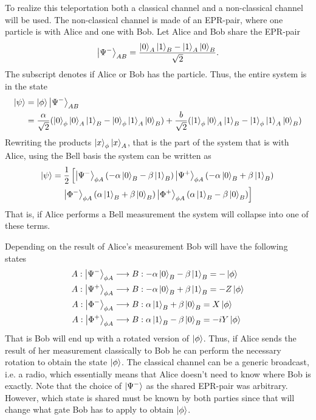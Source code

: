 To realize this teleportation both a classical channel and a non-classical channel will be used. The non-classical channel is made of an EPR-pair, where one particle is with Alice and one with Bob. Let Alice and Bob share the EPR-pair 
\begin{equation}
    \ket{\Psi^-}_{AB} = \frac{\ket{0}_A\ket{1}_B - \ket{1}_A\ket{0}_B}{\sqrt{2}}.
\end{equation}
The subscript denotes if Alice or Bob has the particle. Thus, the entire system is in the state 
\begin{align}
    \ket{\psi} &=\ket{\phi}\ket{\Psi^-}_{AB} \\ &= \frac{\alpha}{\sqrt{2}} (\ket{0}_\phi \ket{0}_A \ket{1}_B - \ket{0}_\phi \ket{1}_A \ket{0}_B) + \frac{b}{\sqrt{2}} (\ket{1}_\phi \ket{0}_A \ket{1}_B - \ket{1}_\phi \ket{1}_A \ket{0}_B)
\end{align}
Rewriting the products $\ket{x}_\phi\ket{x}_A$, that is the part of the system that is with Alice, using the Bell basis the system can be written as 
\begin{multline}
    \ket{\psi} = \frac{1}{2}\left[
        \ket{\Psi^-}_{\phi A} (-\alpha\ket{0}_B - \beta\ket{1}_B)   
        \ket{\Psi^+}_{\phi A} (-\alpha\ket{0}_B + \beta\ket{1}_B)\right.\\
        \left.\ket{\Phi^-}_{\phi A} (\alpha\ket{1}_B + \beta\ket{0}_B)
        \ket{\Phi^+}_{\phi A} (\alpha\ket{1}_B - \beta\ket{0}_B)
        \right]  
\end{multline}
That is, if Alice performs a Bell measurement the system will collapse into one of these terms. \cite{Bennett:1993}

Depending on the result of Alice's measurement Bob will have the following states
\begin{align}
    A: \ket{\Psi^-}_{\phi A} &\longrightarrow B: -\alpha\ket{0}_B - \beta \ket{1}_B = -\ket{\phi}\\
    A: \ket{\Psi^+}_{\phi A} &\longrightarrow B: -\alpha\ket{0}_B + \beta \ket{1}_B = -Z\ket{\phi}\\
    A: \ket{\Phi^-}_{\phi A} &\longrightarrow B: \alpha\ket{1}_B + \beta \ket{0}_B = X\ket{\phi}\\
    A: \ket{\Phi^+}_{\phi A} &\longrightarrow B: \alpha\ket{1}_B - \beta \ket{0}_B = -iY\ket{\phi}\\
\end{align}
That is Bob will end up with a rotated version of $\ket{\phi}$. Thus, if Alice sends the result of her measurement classically to Bob he can perform the necessary rotation to obtain the state $\ket{\phi}$. The classical channel can be a generic broadcast, i.e. a radio, which essentially means that Alice doesn't need to know where Bob is exactly. Note that the choice of $\ket{\Psi^-}$ as the shared EPR-pair was arbitrary. However, which state is shared must be known by both parties since that will change what gate Bob has to apply to obtain $\ket{\phi}$. \cite{Bennett:1993}

